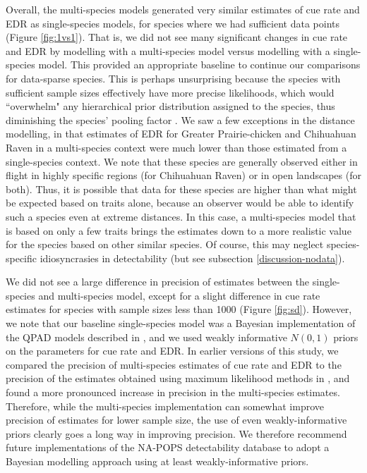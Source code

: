 \documentclass[12pt]{article}
\begin{document}
\par Overall, the multi-species models generated very similar estimates of cue rate and EDR as single-species models, for species where we had sufficient data points (Figure \ref{fig:1vs1}).
That is, we did not see many significant changes in cue rate and EDR by modelling with a multi-species model versus modelling with a single-species model.
This provided an appropriate baseline to continue our comparisons for data-sparse species.
This is perhaps unsurprising because the species with sufficient sample sizes effectively have more precise likelihoods, which would ``overwhelm" any hierarchical prior distribution assigned to the species, thus diminishing the species' pooling factor \citep{gelman_bayesian_2006}.
We saw a few exceptions in the distance modelling, in that estimates of EDR for Greater Prairie-chicken and Chihuahuan Raven in a multi-species context were much lower than those estimated from a single-species context.
We note that these species are generally observed either in flight in highly specific regions (for Chihuahuan Raven) or in open landscapes (for both).
Thus, it is possible that data for these species are higher than what might be expected based on traits alone, because an observer would be able to identify such a species even at extreme distances.
In this case, a multi-species model that is based on only a few traits brings the estimates down to a more realistic value for the species based on other similar species.
Of course, this may neglect species-specific idiosyncrasies in detectability (but see subsection \ref{discussion-nodata}).

\par We did not see a large difference in precision of estimates between the single-species and multi-species model, except for a slight difference in cue rate estimates for species with sample sizes less than 1000 (Figure \ref{fig:sd}).
However, we note that our baseline single-species model was a Bayesian implementation of the QPAD models described in \citet{solymos_calibrating_2013}, and we used weakly informative $N(0,1)$ priors on the parameters for cue rate and EDR.
In earlier versions of this study, we compared the precision of multi-species estimates of cue rate and EDR to the precision of the estimates obtained using maximum likelihood methods in \citet{edwards_point_2023}, and found a more pronounced increase in precision in the multi-species estimates.
Therefore, while the multi-species implementation can somewhat improve precision of estimates for lower sample size, the use of even weakly-informative priors clearly goes a long way in improving precision.
We therefore recommend future implementations of the NA-POPS detectability database to adopt a Bayesian modelling approach using at least weakly-informative priors.
\end{document}
